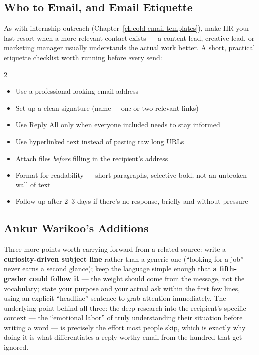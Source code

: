 \subsection{Who to Email, and Email Etiquette}

As with internship outreach (Chapter~\ref{ch:cold-email-templates}), make HR your last resort when a more
relevant contact exists — a content lead, creative lead, or marketing manager usually understands the actual
work better. A short, practical etiquette checklist worth running before every send:

\begin{multicols}{2}
\begin{itemize}[nosep]
  \item Use a professional-looking email address
  \item Set up a clean signature (name + one or two relevant links)
  \item Use Reply All only when everyone included needs to stay informed
  \item Use hyperlinked text instead of pasting raw long URLs
  \item Attach files \emph{before} filling in the recipient's address
  \item Format for readability — short paragraphs, selective bold, not an unbroken wall of text
  \item Follow up after 2--3 days if there's no response, briefly and without pressure
\end{itemize}
\end{multicols}

\subsection{Ankur Warikoo's Additions}

Three more points worth carrying forward from a related source: write a \textbf{curiosity-driven subject line}
rather than a generic one (``looking for a job'' never earns a second glance); keep the language simple enough
that \textbf{a fifth-grader could follow it} — the weight should come from the message, not the vocabulary;
state your purpose and your actual ask within the first few lines, using an explicit ``headline'' sentence to
grab attention immediately. The underlying point behind all three: the deep research into the recipient's
specific context — the ``emotional labor'' of truly understanding their situation before writing a word — is
precisely the effort most people skip, which is exactly why doing it is what differentiates a reply-worthy email
from the hundred that get ignored.

